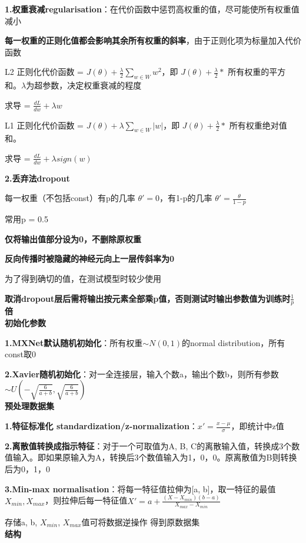 \documentclass[UTF8]{ctexart}
\begin{document}
  \textbf{1.权重衰减regularisation}：在代价函数中惩罚高权重的值，尽可能使所有权重值减小

  \quad \textbf{每一权重的正则化值都会影响其余所有权重的斜率}，由于正则化项为标量加入代价函数

  \quad L2 正则化代价函数 = $J(\theta) + \frac{\lambda}{2}\sum_{w\in W}w^2$，即 $J(\theta) + \frac{\lambda}{2} * $ 所有权重的平方和。$\lambda$为超参数，决定权重衰减的程度

  \quad \quad 求导 = $\frac{dL}{dw} + \lambda w$
  
  \quad L1 正则化代价函数 = $J(\theta) + \lambda \sum_{w\in W} |w|$，即 $J(\theta) + \frac{\lambda}{2} * $ 所有权重绝对值和。

  \quad \quad 求导 = $\frac{dL}{dw} + \lambda sign(w)$

  \textbf{2.丢弃法dropout}

  \quad 每一权重（不包括const）有p的几率 $\theta' = 0$，有1-p的几率 $\theta' = \frac{\theta}{1-p}$

  \quad \quad 常用p = 0.5

  \quad \quad \textbf{仅将输出值部分设为0，不删除原权重}

  \quad \quad \textbf{反向传播时被隐藏的神经元向上一层传斜率为0}

  \quad 为了得到确切的值，在测试模型时较少使用
  
  \quad \quad \textbf{取消dropout层后需将输出按元素全部乘p值，否则测试时输出参数值为训练时$\frac{1}{p}$倍}\\
\textbf{初始化参数}

  \textbf{1.MXNet默认随机初始化}：所有权重$\sim N(0, 1)$的normal distribution，所有const取0

  \textbf{2.Xavier随机初始化}：对一全连接层，输入个数a，输出个数b，则所有参数$\sim U(-\sqrt{\frac{6}{a+b}}, \sqrt{\frac{6}{a+b}})$\\
\textbf{预处理数据集}

  \textbf{1.特征标准化 standardization/z-normalization}：$x' = \frac{x - \mu}{\sigma}$，即统计中z值

  \textbf{2.离散值转换成指示特征}：对于一个可取值为A, B, C的离散输入值，转换成3个数值输入。即如果原输入为A，转换后3个数值输入为1，0，0。原离散值为B则转换后为0，1，0
  
  \textbf{3.Min-max normalisation}：将每一特征值拉伸为[a, b]，取一特征的最值$X_{min}, X_{max}$，则拉伸后每一特征值$X' = a + \frac{(X - X_{min})(b - a)}{X_{max} - X_{min}}$
  
  \quad 存储a, b, $X_{min}$, $X_{max}$值可将数据逆操作 得到原数据集\\
\textbf{结构}
  
\end{document}
